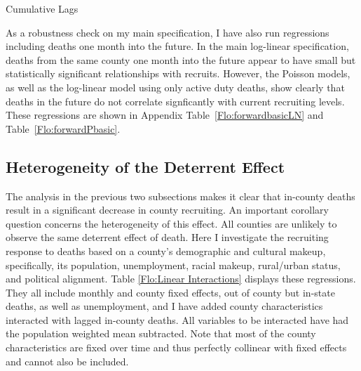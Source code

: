 \documentclass[12pt] {article}
\begin{document}
\begin{table}
\caption{Cumulative Lags}
\label{Flo:Cumulative LagsLN}
\scalebox{0.75}{}
\end{table}

As a robustness check on my main specification, I have also run regressions including deaths one month into the future. In the main log-linear specification, deaths from the same county one month into the future appear to have small but statistically significant relationships with recruits. However, the Poisson models, as well as the log-linear model using only active duty deaths, show clearly that deaths in the future do not correlate signficantly with current recruiting levels.  These regressions are shown in Appendix Table~\ref{Flo:forwardbasicLN} and Table~\ref{Flo:forwardPbasic}. 

\subsection{Heterogeneity of the Deterrent Effect\label{sub:interactions}}

The analysis in the previous two subsections makes it clear that in-county
deaths result in a significant decrease in county recruiting. An important
corollary question concerns the heterogeneity of this effect.
All counties are unlikely to observe the same deterrent effect of
death. Here I investigate the recruiting response to deaths based
on a county's demographic and cultural makeup, specifically, its population,
unemployment, racial makeup, rural/urban status, and political alignment.
Table \ref{Flo:Linear Interactions} displays these regressions.
They all include monthly and county fixed effects, out of county but
in-state deaths, as well as unemployment, and I have added county
characteristics interacted with lagged in-county deaths. All variables
to be interacted have had the population weighted mean subtracted. %
Note that most of the county characteristics are fixed over time and thus perfectly collinear with fixed effects and cannot also be included.
\end{document}
